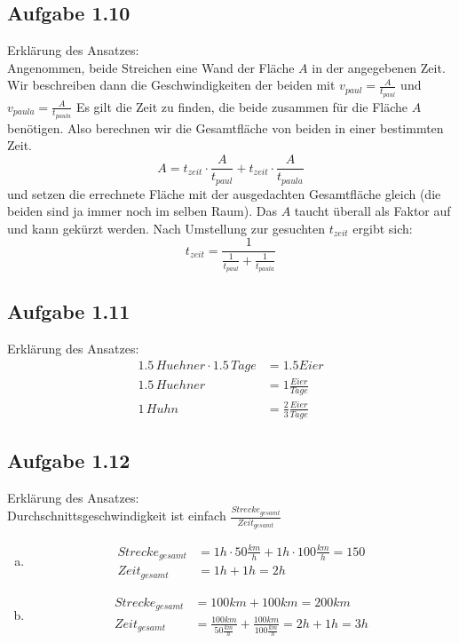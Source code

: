 \documentclass{standalone}
\begin{document}
\subsection{Aufgabe 1.10}
Erklärung des Ansatzes: \\
Angenommen, beide Streichen eine Wand der Fläche $A$ in der angegebenen Zeit. Wir beschreiben dann die Geschwindigkeiten der beiden mit $v_{paul} = \frac{A}{t_{paul}}$ und $v_{paula }= \frac{A}{t_{paula}}$
Es gilt die Zeit zu finden, die beide zusammen für die Fläche $A$ benötigen. Also berechnen wir die Gesamtfläche von beiden in einer bestimmten Zeit.
$$ A = t_{zeit} \cdot \frac{A}{t_{paul}} + t_{zeit} \cdot \frac{A}{t_{paula}} $$
und setzen die errechnete Fläche mit der ausgedachten Gesamtfläche gleich (die beiden sind ja immer noch im selben Raum).
Das $A$ taucht überall als Faktor auf und kann gekürzt werden. Nach Umstellung zur gesuchten $t_{zeit}$ ergibt sich:
$$t_{zeit} = \frac{1}{\frac{1}{t_{paul}} + \frac{1}{t_{paula}}}$$

\subsection{Aufgabe 1.11}
Erklärung des Ansatzes: \\
\begin{align}
    1.5\, Huehner \cdot 1.5\, Tage &= 1.5 Eier \\
    1.5\, Huehner &= 1 \frac{Eier}{Tage} \\
    1\, Huhn &= \frac{2}{3} \frac{Eier}{Tage}
\end{align}

\subsection{Aufgabe 1.12}
Erklärung des Ansatzes: \\
Durchschnittsgeschwindigkeit ist einfach $\frac{Strecke_{gesamt}}{Zeit_{gesamt}}$

\begin{enumerate}[a)]
    \item \begin{align}
        Strecke_{gesamt} &= 1 h \cdot 50 \frac{km}{h} + 1 h \cdot 100 \frac{km}{h} = 150 \\
        Zeit_{gesamt} &= 1 h + 1 h = 2 h
    \end{align}
    \item \begin{align}
        Strecke_{gesamt} &= 100 km + 100 km = 200 km \\
        Zeit_{gesamt} &= \frac{100 km}{50 \frac{km}{h}} + \frac{100 km}{100 \frac{km}{h}} = 2 h + 1 h = 3 h
    \end{align}
\end{enumerate}
\end{document}
